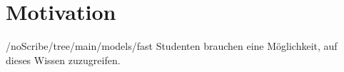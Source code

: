 
\section{Motivation}
/noScribe/tree/main/models/fast
Studenten brauchen eine Möglichkeit, auf dieses Wissen zuzugreifen. 


